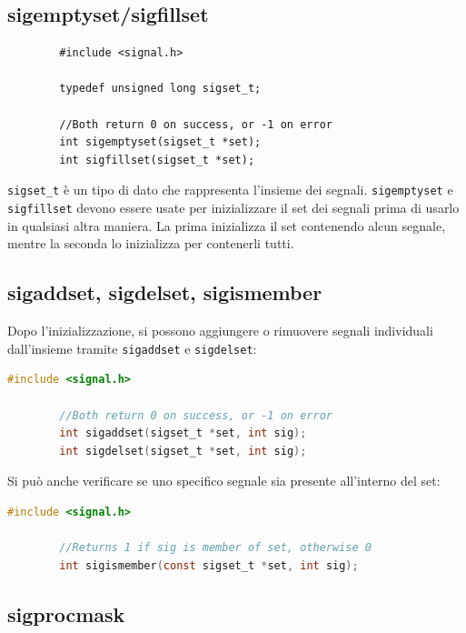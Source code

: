 \documentclass[a4paper, 12pt]{book}
\begin{document}
    \subsection{sigemptyset/sigfillset}

    \begin{lstlisting}
        #include <signal.h>

        typedef unsigned long sigset_t;

        //Both return 0 on success, or -1 on error 
        int sigemptyset(sigset_t *set);
        int sigfillset(sigset_t *set);
    \end{lstlisting}
    \verb|sigset_t| è un tipo di dato che rappresenta l'insieme 
    dei segnali. \verb|sigemptyset| e \verb|sigfillset| 
    devono essere usate per inizializzare il set 
    dei segnali prima di usarlo in qualsiasi altra maniera.
    La prima inizializza il set contenendo alcun segnale, 
    mentre la seconda lo inizializza per contenerli tutti.

    \subsection{sigaddset, sigdelset, sigismember}

    Dopo l'inizializzazione, si possono aggiungere o rimuovere 
    segnali individuali dall'insieme tramite \verb|sigaddset| 
    e \verb|sigdelset|:
    \begin{lstlisting}[language=C]
        #include <signal.h>

        //Both return 0 on success, or -1 on error 
        int sigaddset(sigset_t *set, int sig);
        int sigdelset(sigset_t *set, int sig);
    \end{lstlisting}
    Si può anche verificare se uno specifico segnale 
    sia presente all'interno del set:
    \begin{lstlisting}[language=C]
        #include <signal.h>

        //Returns 1 if sig is member of set, otherwise 0 
        int sigismember(const sigset_t *set, int sig);
    \end{lstlisting}

    \subsection{sigprocmask}
\end{document}

